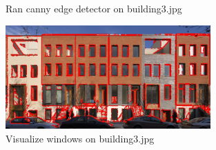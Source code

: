 \documentclass{csc_assignment4}
\begin{document}
\begin{description}
\begin{figure}
\caption{Ran canny edge detector on building\textunderscore3.jpg}
\end{figure}
\begin{figure}
\vspace{-20mm}
\includegraphics[width=0.7\textwidth, center]{building_3_windows.jpg}
\caption{Visualize windows on building\textunderscore3.jpg}
\end{figure}
\end{description}
\end{document}
